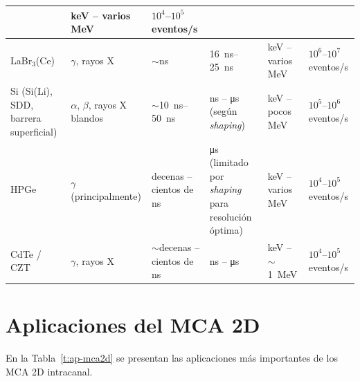 \begin{table}[H]
\begin{tabularx}{\textwidth}{|>{\raggedright\arraybackslash}p{}|Y|Y|Y|Y|Y|}
  & \unit{\kilo\electronvolt} -- varios \unit{\mega\electronvolt}
  & $10^4$--$10^5$ eventos/s \\ \hline
LaBr$_3$(Ce)
  & $\gamma$, rayos X
  & $\sim$\unit{\nano\second}
  & \qtyrange{16}{25}{\nano\second}
  & \unit{\kilo\electronvolt} -- varios \unit{\mega\electronvolt}
  & $10^6$--$10^7$ eventos/s \\ \hline
Si (Si(Li), SDD, barrera superficial)
  & $\alpha$, $\beta$, rayos X blandos
  & $\sim$\qtyrange{10}{50}{\nano\second}
  & \unit{\nano\second} -- \unit{\micro\second} (según \emph{shaping})
  & \unit{\kilo\electronvolt} -- pocos \unit{\mega\electronvolt}
  & $10^5$--$10^6$ eventos/s \\ \hline
HPGe
  & $\gamma$ (principalmente)
  & decenas -- cientos de \unit{\nano\second}
  & \unit{\micro\second} (limitado por \emph{shaping} para resolución óptima)
  & \unit{\kilo\electronvolt} -- varios \unit{\mega\electronvolt}
  & $10^4$--$10^5$ eventos/s \\ \hline
CdTe / CZT
  & $\gamma$, rayos X
  & $\sim$decenas -- cientos de \unit{\nano\second}
  & \unit{\nano\second} -- \unit{\micro\second}
  & \unit{\kilo\electronvolt} -- $\sim$\qty{1}{\mega\electronvolt}
  & $10^4$--$10^5$ eventos/s \\ \hline
\end{tabularx}
\end{table}

\section{Aplicaciones del MCA 2D}
\label{S:ap-mca2d}

En la Tabla~\ref{t:ap-mca2d} se presentan las aplicaciones más importantes de
los MCA 2D intracanal.

